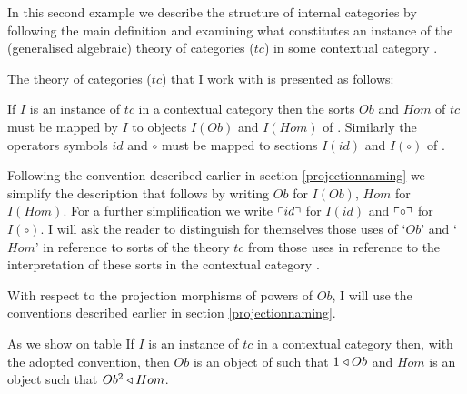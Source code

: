 In this second example we describe the structure of internal categories by following the main definition and examining
what constitutes an instance of the (generalised algebraic) theory of categories ($tc$) in some 
 contextual category \catc.

The theory of categories ($tc$) that I work with is presented as follows:


\iffalse
\begin{gatrules}
\gatintros
\gatintroducing{Ob}
\isT{Ob} \\
\gatintroducing{Hom}
  \gatsingular{\ofT{x_1,x_2}{Ob}}{\isT{Hom(x_1,x_2)}} \\	
\gatintroducing{id}
  \gatsingular{\ofT{w}{Ob}}{\ofT{id(w)}{Hom(w,w)}} \\	
\gataxioms
\gatintroducing{  \gataxiomno{1} \\   \gataxiomno{2}}
\begin{gatgroup}{\ofT{f}{Hom(x_1,x_2)},\ \ofT{x_1,x_2}{Ob}}
    \gatleaf{}{id_{x_1} \circ f = f} \\
    \gatleaf{}{f \circ id_{x_2} = f}
\end{gatgroup} \\
\gatintroducing{ \gataxiomno{3} }
\gatsingular{\associativitypremisereversed}{(f \circ g) \circ h = f \circ (g \circ h)} 
\end{gatrules}
\fi

If $I$ is an instance of $tc$ in a contextual category \catcw then the sorts $Ob$ and $Hom$ of $tc$ 
must be mapped by $I$  to objects $I(Ob)$ and  $I(Hom)$ of \catc.
Similarly  the operators symbols
$id$ and $\circ$ must be mapped to sections $I(id)$ and $I(\circ)$ of \catc.

Following the convention described earlier in section \ref{projectionnaming} we simplify  
the description that follows by writing $Ob$ for $I(Ob)$, $Hom$ for $I(Hom)$.
For a further simplification we write $\left\ulcorner id\right\urcorner$ for $I(id)$ and   $\left\ulcorner\circ\right\urcorner$ for $I(\circ)$.   I will ask the reader  to distinguish for themselves 
those uses of `$Ob$' and `$Hom$' in reference to sorts of the theory $tc$ from those uses in reference to the interpretation of these sorts in the contextual category \catc. 

With respect to the projection morphisms of powers of $Ob$, I will use the conventions described earlier in section \ref{projectionnaming}.

As we show on table  If $I$ is an instance of $tc$ in a contextual category \catcw then, with the adopted convention,
then $Ob$ is an object of \catcw such that $1 \triangleleft Ob$ and $Hom$ is an object such that $Ob^2 \triangleleft Hom$. 

